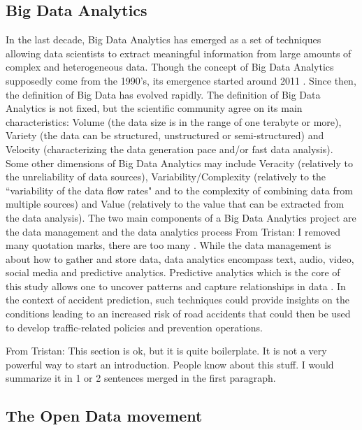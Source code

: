 \documentclass[conference]{IEEEtran}
\newcommand{\TG}[1]{\colorlet{saved}{.}\color{orange}From Tristan: #1\color{saved}}
\begin{document}
\subsection{Big Data Analytics}

In the last decade, Big Data Analytics has emerged as a set of techniques allowing data scientists to extract meaningful information from large amounts of complex and heterogeneous data. Though the concept of Big Data Analytics supposedly come from the 1990's, its emergence started around 2011 \cite{Gandomi2015}. Since then, the definition of Big Data has evolved rapidly. The definition of Big Data Analytics is not fixed, but the scientific community agree on its main characteristics: Volume (the data size is in the range of one terabyte or more), Variety (the data can be structured, unstructured or semi-structured) and Velocity (characterizing the data generation pace and/or fast data analysis). Some other dimensions of Big Data Analytics may include Veracity (relatively to the unreliability of data sources), Variability/Complexity (relatively to the ``variability of the data flow rates" and to the complexity of combining data from multiple sources) and Value (relatively to the value that can be extracted from the data analysis). The two main components of a Big Data Analytics project are the data management and the data analytics process \TG{I removed many quotation marks, there are too many} \cite{Gandomi2015}. While the data management is about how to gather and store data, data analytics encompass text, audio, video, social media and predictive analytics. Predictive analytics which is the core of this study allows one to uncover patterns and capture relationships in data \cite{Gandomi2015}. In the context of accident prediction, such techniques could provide insights on the conditions leading to an increased risk of road accidents that could then be used to develop traffic-related policies and prevention operations. 

\TG{This section is ok, but it is quite boilerplate. It is not a very powerful way to start
an introduction. People know about this stuff. I would summarize it in 1 or 2 sentences merged in the first paragraph.}

\subsection{The Open Data movement}
\end{document}
